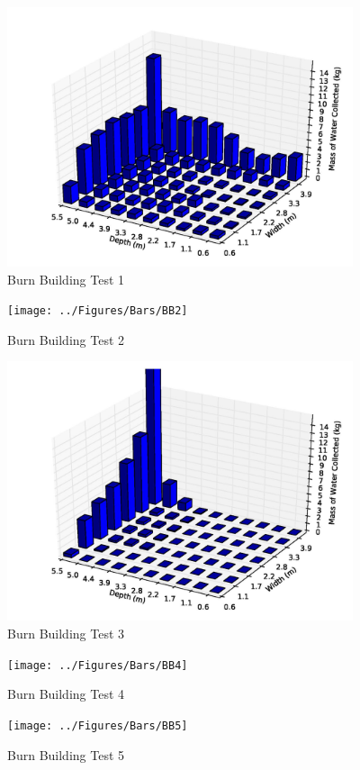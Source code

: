 \documentclass[12pt,oneside]{book}
\begin{document}
\begin{figure}[!ht]
	\includegraphics[width=4in]{../Figures/Bars/BB1}
	\caption{Burn Building Test 1}
	\label{fig:Burn_Building_Test_1}
\end{figure}

\begin{figure}[!ht]
	\texttt{[image: ../Figures/Bars/BB2]}
	\caption{Burn Building Test 2}
	\label{fig:Burn_Building_Test_2}
\end{figure}

\begin{figure}[!ht]
	\includegraphics[width=4in]{../Figures/Bars/BB3}
	\caption{Burn Building Test 3}
	\label{fig:Burn_Building_Test_3}
\end{figure}

\begin{figure}[!ht]
	\texttt{[image: ../Figures/Bars/BB4]}
	\caption{Burn Building Test 4}
	\label{fig:Burn_Building_Test_4}
\end{figure}

\clearpage

\begin{figure}[!ht]
	\texttt{[image: ../Figures/Bars/BB5]}
	\caption{Burn Building Test 5}
	\label{fig:Burn_Building_Test_5}
\end{figure}
\end{document}
